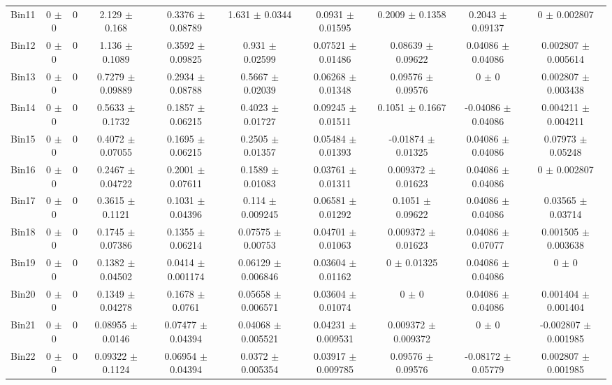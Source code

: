 \begin{tabular}{@{\extracolsep{4pt}}lccccccccc@{}}
     Bin11 & 0 $\pm$ 0 & 0 & 2.129 $\pm$ 0.168 & 0.3376 $\pm$ 0.08789 & 1.631 $\pm$ 0.0344 & 0.0931 $\pm$ 0.01595 & 0.2009 $\pm$ 0.1358 & 0.2043 $\pm$ 0.09137 & 0 $\pm$ 0.002807 \\ 
     Bin12 & 0 $\pm$ 0 & 0 & 1.136 $\pm$ 0.1089 & 0.3592 $\pm$ 0.09825 & 0.931 $\pm$ 0.02599 & 0.07521 $\pm$ 0.01486 & 0.08639 $\pm$ 0.09622 & 0.04086 $\pm$ 0.04086 & 0.002807 $\pm$ 0.005614 \\ 
     Bin13 & 0 $\pm$ 0 & 0 & 0.7279 $\pm$ 0.09889 & 0.2934 $\pm$ 0.08788 & 0.5667 $\pm$ 0.02039 & 0.06268 $\pm$ 0.01348 & 0.09576 $\pm$ 0.09576 & 0 $\pm$ 0 & 0.002807 $\pm$ 0.003438 \\ 
     Bin14 & 0 $\pm$ 0 & 0 & 0.5633 $\pm$ 0.1732 & 0.1857 $\pm$ 0.06215 & 0.4023 $\pm$ 0.01727 & 0.09245 $\pm$ 0.01511 & 0.1051 $\pm$ 0.1667 & -0.04086 $\pm$ 0.04086 & 0.004211 $\pm$ 0.004211 \\ 
     Bin15 & 0 $\pm$ 0 & 0 & 0.4072 $\pm$ 0.07055 & 0.1695 $\pm$ 0.06215 & 0.2505 $\pm$ 0.01357 & 0.05484 $\pm$ 0.01393 & -0.01874 $\pm$ 0.01325 & 0.04086 $\pm$ 0.04086 & 0.07973 $\pm$ 0.05248 \\ 
     Bin16 & 0 $\pm$ 0 & 0 & 0.2467 $\pm$ 0.04722 & 0.2001 $\pm$ 0.07611 & 0.1589 $\pm$ 0.01083 & 0.03761 $\pm$ 0.01311 & 0.009372 $\pm$ 0.01623 & 0.04086 $\pm$ 0.04086 & 0 $\pm$ 0.002807 \\ 
     Bin17 & 0 $\pm$ 0 & 0 & 0.3615 $\pm$ 0.1121 & 0.1031 $\pm$ 0.04396 & 0.114 $\pm$ 0.009245 & 0.06581 $\pm$ 0.01292 & 0.1051 $\pm$ 0.09622 & 0.04086 $\pm$ 0.04086 & 0.03565 $\pm$ 0.03714 \\ 
     Bin18 & 0 $\pm$ 0 & 0 & 0.1745 $\pm$ 0.07386 & 0.1355 $\pm$ 0.06214 & 0.07575 $\pm$ 0.00753 & 0.04701 $\pm$ 0.01063 & 0.009372 $\pm$ 0.01623 & 0.04086 $\pm$ 0.07077 & 0.001505 $\pm$ 0.003638 \\ 
     Bin19 & 0 $\pm$ 0 & 0 & 0.1382 $\pm$ 0.04502 & 0.0414 $\pm$ 0.001174 & 0.06129 $\pm$ 0.006846 & 0.03604 $\pm$ 0.01162 & 0 $\pm$ 0.01325 & 0.04086 $\pm$ 0.04086 & 0 $\pm$ 0 \\ 
     Bin20 & 0 $\pm$ 0 & 0 & 0.1349 $\pm$ 0.04278 & 0.1678 $\pm$ 0.0761 & 0.05658 $\pm$ 0.006571 & 0.03604 $\pm$ 0.01074 & 0 $\pm$ 0 & 0.04086 $\pm$ 0.04086 & 0.001404 $\pm$ 0.001404 \\ 
     Bin21 & 0 $\pm$ 0 & 0 & 0.08955 $\pm$ 0.0146 & 0.07477 $\pm$ 0.04394 & 0.04068 $\pm$ 0.005521 & 0.04231 $\pm$ 0.009531 & 0.009372 $\pm$ 0.009372 & 0 $\pm$ 0 & -0.002807 $\pm$ 0.001985 \\ 
     Bin22 & 0 $\pm$ 0 & 0 & 0.09322 $\pm$ 0.1124 & 0.06954 $\pm$ 0.04394 & 0.0372 $\pm$ 0.005354 & 0.03917 $\pm$ 0.009785 & 0.09576 $\pm$ 0.09576 & -0.08172 $\pm$ 0.05779 & 0.002807 $\pm$ 0.001985 \\ 

\end{tabular}
